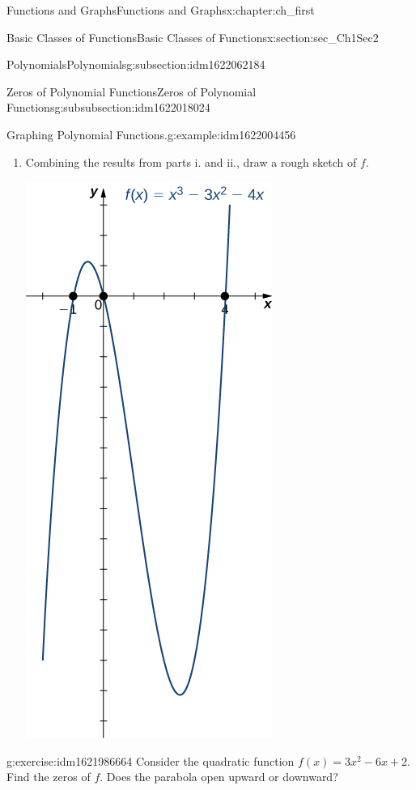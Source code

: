 \documentclass[oneside,10pt,]{book}
\numberwithin{equation}{section}
\begin{document}
\begin{chapterptx}{Functions and Graphs}{}{Functions and Graphs}{}{}{x:chapter:ch_first}
\begin{sectionptx}{Basic Classes of Functions}{}{Basic Classes of Functions}{}{}{x:section:sec_Ch1Sec2}
\begin{subsectionptx}{Polynomials}{}{Polynomials}{}{}{g:subsection:idm1622062184}
\begin{subsubsectionptx}{Zeros of Polynomial Functions}{}{Zeros of Polynomial Functions}{}{}{g:subsubsection:idm1622018024}
\begin{example}{Graphing Polynomial Functions.}{g:example:idm1622004456}
\begin{enumerate}
\begin{enumerate}
\item{}Combining the results from parts i. and ii., draw a rough sketch of \(f.\) \begin{image}{0.25}{0.5}{0.25}%
\includegraphics[width=\linewidth]{external/CNX_Calc_Figure_01_02_007.jpg}
\end{image}%
%
\end{enumerate}
\end{enumerate}
\end{example}
\begin{inlineexercise}{}{g:exercise:idm1621986664}%
Consider the quadratic function \(f(x)= 3 x^2 - 6 x+ 2 .\) Find the zeros of \(f.\) Does the parabola open upward or downward?%
\par\smallskip%
\noin
\end{inlineexercise}
\end{subsubsectionptx}
\end{subsectionptx}
\end{sectionptx}
\end{chapterptx}
\end{document}
